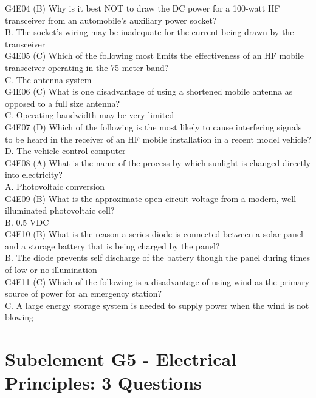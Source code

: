 \documentclass[12pt,letterpaper]{report}
\begin{document}
G4E04 (B) Why is it best NOT to draw the DC power for a 100-watt HF transceiver from an automobile's auxiliary power socket?\\
B. The socket's wiring may be inadequate for the current being drawn by the
transceiver\\

G4E05 (C) Which of the following most limits the effectiveness of an HF mobile transceiver operating in the 75 meter band?\\
C. The antenna system\\

G4E06 (C) What is one disadvantage of using a shortened mobile antenna as opposed to a full size antenna?\\
C. Operating bandwidth may be very limited\\

G4E07 (D) Which of the following is the most likely to cause interfering signals to be heard in the receiver of an HF mobile installation in a recent model vehicle?\\
D. The vehicle control computer\\

G4E08 (A) What is the name of the process by which sunlight is changed directly into electricity?\\
A. Photovoltaic conversion\\

G4E09 (B) What is the approximate open-circuit voltage from a modern, well-illuminated photovoltaic cell?\\
B. 0.5 VDC\\

G4E10 (B) What is the reason a series diode is connected between a solar panel and a storage battery that is being charged by the panel?\\
B. The diode prevents self discharge of the battery though the panel during times of low or no illumination\\

G4E11 (C) Which of the following is a disadvantage of using wind as the primary source of power for an emergency station?\\
C. A large energy storage system is needed to supply power when the wind is not blowing\\

\chapter{Subelement G5 - Electrical Principles: 3 Questions}
\end{document}

